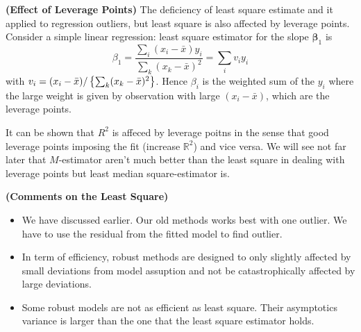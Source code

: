 \begin{remark}{\textbf{(Effect of Leverage Points)}}
    The deficiency of least square estimate and it applied to regression outliers, but least square is also affected by leverage points. Consider a simple linear regression: least square estimator for the slope $\boldsymbol \beta_1$ is 
    \begin{equation*}
        \beta_1 = \frac{\sum_i(x_i - \bar{x})y_i}{\sum_k(x_k - \bar{x})^2} = \sum_iv_iy_i
    \end{equation*}
    with $v_i = (x_i-\bar{x})/\left\{ \sum_k(x_k-\bar{x})^2 \right\}$. Hence $\beta_i$ is the weighted sum of the $y_i$ where the large weight is given by observation with large $(x_i - \bar{x})$, which are the leverage points. 
\end{remark}

\begin{remark}
    It can be shown that $R^2$ is affeced by leverage poitns in the sense that good leverage points imposing the fit (increase $\mathbb{R}^2$) and vice versa. We will see not far later that $M$-estimator aren't much better than the least square in dealing with leverage points but least median square-estimator is.
\end{remark}

\begin{remark}{\textbf{(Comments on the Least Square)}}
    \begin{itemize}
        \item We have discussed earlier. Our old methods works best with one outlier. We have to use the residual from the fitted model to find outlier. 
        \item In term of efficiency, robust methods are designed to only slightly affected by small deviations from model assuption and not be catastrophically affected by large deviations. 
        \item Some robust models are not as efficient as least square. Their asymptotics variance is larger than the one that the least square estimator holds. 
    \end{itemize}
\end{remark}

